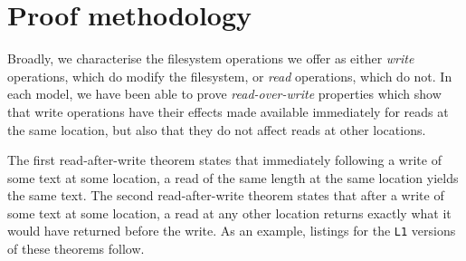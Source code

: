 \documentclass[submission,copyright,creativecommons]{eptcs}
\begin{document}



\section{Proof methodology}

Broadly, we characterise the filesystem
operations we offer as either \textit{write} operations, which do
modify the filesystem, or \textit{read} operations, which do not. In
each model, we have been able to prove \textit{read-over-write}
properties which show that write operations have
their effects made available immediately for reads at the same
location, but also that they do not affect reads at other locations.

The first read-after-write theorem states that immediately following a
write of some text at some location, a read of the same length at the
same location yields the same text. The second read-after-write
theorem states that after a write of some text at some location, a
read at any other location returns exactly what it would have returned
before the write. As an example, listings for the \texttt{L1} versions
of these theorems follow.
\end{document}
